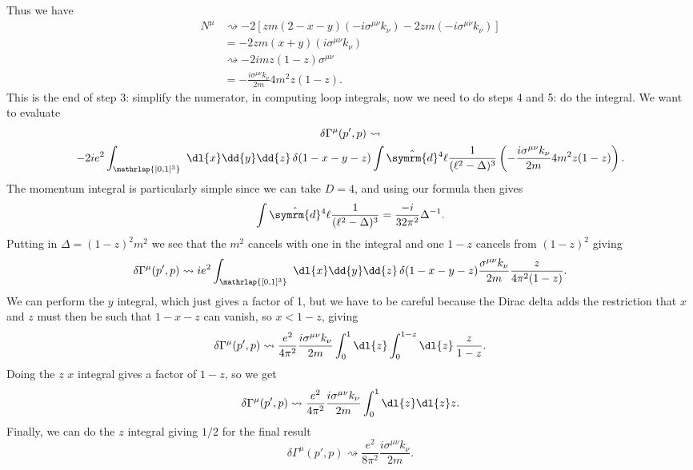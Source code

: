 \documentclass[fleqn]{NotesClass}
\newcommand{\dhat}[1]{\hat{\symrm{d}}{#1}}
\begin{document}
    Thus we have
    \begin{align}
        N^\mu &\rightsquigarrow -2[zm(2 - x - y)(-i\sigma^{\mu\nu}k_\nu) - 2zm(-i\sigma^{\mu\nu}k_\nu)]\\
        &= -2zm(x + y)(i\sigma^{\mu\nu}k_\nu)\\
        &\rightsquigarrow -2imz(1 - z)\sigma^{\mu\nu}\\
        &= -\frac{i\sigma^{\mu\nu}k_\nu}{2m}4m^2z(1 - z).
    \end{align}
    This is the end of step 3: simplify the numerator, in computing loop integrals, now we need to do steps 4 and 5: do the integral.
    We want to evaluate
    \begin{multline}
        \delta\Gamma^{\mu}(p', p) \rightsquigarrow \\
        -2ie^2 \int_{\mathrlap{[0,1]^3}} \  \dl{x} \dd{y} \dd{z} \, \delta(1 - x - y - z) \int \dhat{^4\ell} \frac{1}{(\ell^2 - \Delta)^3} \left( -\frac{i\sigma^{\mu\nu}k_\nu}{2m} 4m^2 z(1 - z) \right).
    \end{multline}
    The momentum integral is particularly simple since we can take \(D = 4\), and using our formula then gives
    \begin{equation}
        \int \dhat{^4\ell} \frac{1}{(\ell^2 - \Delta)^3} = \frac{-i}{32\pi^2} \Delta^{-1}.
    \end{equation}
    Putting in \(\Delta = (1 - z)^2m^2\) we see that the \(m^2\) cancels with one in the integral and one \(1 - z\) cancels from \((1 - z)^2\) giving
    \begin{equation}
        \delta\Gamma^\mu(p', p) \rightsquigarrow ie^2 \int_{\mathrlap{[0,1]^3}} \  \dl{x} \dd{y} \dd{z} \, \delta(1 - x - y - z) \frac{\sigma^{\mu\nu}k_\nu}{2m} \frac{z}{4\pi^2(1 - z)}.
    \end{equation}
    We can perform the \(y\) integral, which just gives a factor of 1, but we have to be careful because the Dirac delta adds the restriction that \(x\) and \(z\) must then be such that \(1 - x - z\) can vanish, so \(x < 1 - z\), giving
    \begin{equation}
        \delta\Gamma^\mu(p', p) \rightsquigarrow \frac{e^2}{4\pi^2} \frac{i\sigma^{\mu\nu}k_\nu}{2m} \int_0^1 \dl{z} \int_0^{1 - z} \dl{z} \, \frac{z}{1 - z}.
    \end{equation}
    Doing the \(z\) \(x\) integral gives a factor of \(1 - z\), so we get
    \begin{equation}
        \delta\Gamma^\mu(p', p) \rightsquigarrow \frac{e^2}{4\pi^2} \frac{i\sigma^{\mu\nu}k_\nu}{2m} \int_0^1 \dl{z}  \dl{z} z.
    \end{equation}
    Finally, we can do the \(z\) integral giving \(1/2\) for the final result
    \begin{equation}
        \delta\Gamma^\mu(p', p) \rightsquigarrow \frac{e^2}{8\pi^2} \frac{i\sigma^{\mu\nu}k_\nu}{2m}.
    \end{equation}
    
\end{document}
